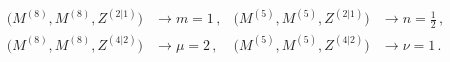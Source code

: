 \begin{equation}
\begin{aligned}
\big(M^{(8)},M^{(8)},Z^{(2|1)}\big) &\rightarrow m=1\, ,&
\big(M^{(5)},M^{(5)},Z^{(2|1)}\big) &\rightarrow n=\tfrac{1}{2}\, ,\\[1ex]
\big(M^{(8)},M^{(8)},Z^{(4|2)}\big) &\rightarrow \mu=2\, ,&
\big(M^{(5)},M^{(5)},Z^{(4|2)}\big) &\rightarrow \nu=1\, .
\end{aligned}
\end{equation}

